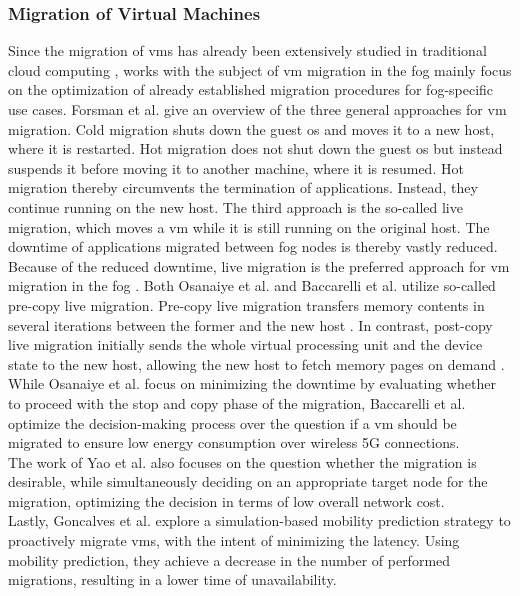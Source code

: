 \subsubsection{Migration of Virtual Machines}
\label{lMigrationVM}
Since the migration of \gls{vm}s has already been extensively studied in traditional cloud computing \cite{Yao.2015}, works with the subject of \gls{vm} migration in the fog mainly focus on the optimization of already established migration procedures for fog-specific use cases. Forsman et al. \cite{Forsman.2015} give an overview of the three general approaches for \gls{vm} migration. Cold migration shuts down the guest \gls{os} and moves it to a new host, where it is restarted. Hot migration does not shut down the guest \gls{os} but instead suspends it before moving it to another machine, where it is resumed. Hot migration thereby circumvents the termination of applications. Instead, they continue running on the new host. The third approach is the so-called live migration, which moves a \gls{vm} while it is still running on the original host. The downtime of applications migrated between fog nodes is thereby vastly reduced. Because of the reduced downtime, live migration is the preferred approach for \gls{vm} migration in the fog \cite{Baccarelli.2018, Osanaiye.2017}. Both Osanaiye et al. \cite{Osanaiye.2017} and Baccarelli et al. \cite{Baccarelli.2018} utilize so-called pre-copy live migration. Pre-copy live migration transfers memory contents in several iterations between the former and the new host \cite{Osanaiye.2017}. In contrast, post-copy live migration initially sends the whole virtual processing unit and the device state to the new host, allowing the new host to fetch memory pages on demand \cite{Osanaiye.2017}. While Osanaiye et al. \cite{Osanaiye.2017} focus on minimizing the downtime by evaluating whether to proceed with the stop and copy phase of the migration, Baccarelli et al. \cite{Baccarelli.2018} optimize the decision-making process over the question if a \gls{vm} should be migrated to ensure low energy consumption over wireless 5G connections.\\
The work of Yao et al. \cite{Yao.2015} also focuses on the question whether the migration is desirable, while simultaneously deciding on an appropriate target node for the migration, optimizing the decision in terms of low overall network cost.\\
Lastly, Goncalves et al. \cite{Goncalves.2018} explore a simulation-based mobility prediction strategy to proactively migrate \gls{vm}s, with the intent of minimizing the latency. Using mobility prediction, they achieve a decrease in the number of performed migrations, resulting in a lower time of unavailability.



